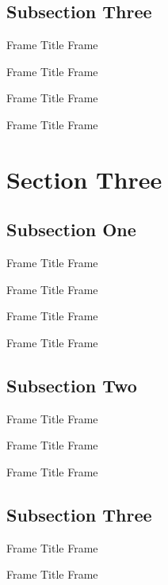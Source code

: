\documentclass[14pt,xcolor={rgb}]{beamer}
\begin{document}
\subsection{Subsection Three}

\begin{frame}{Frame Title}
Frame \insertframenumber
\end{frame}

\begin{frame}{Frame Title}
Frame \insertframenumber
\end{frame}

\begin{frame}{Frame Title}
Frame \insertframenumber
\end{frame}

\begin{frame}{Frame Title}
Frame \insertframenumber
\end{frame}

\section{Section Three}

\subsection{Subsection One}

\begin{frame}{Frame Title}
Frame \insertframenumber
\end{frame}

\begin{frame}{Frame Title}
Frame \insertframenumber
\end{frame}

\begin{frame}{Frame Title}
Frame \insertframenumber
\end{frame}

\begin{frame}{Frame Title}
Frame \insertframenumber
\end{frame}

\subsection{Subsection Two}

\begin{frame}{Frame Title}
Frame \insertframenumber
\end{frame}

\begin{frame}{Frame Title}
Frame \insertframenumber
\end{frame}

\begin{frame}{Frame Title}
Frame \insertframenumber
\end{frame}

\subsection{Subsection Three}

\begin{frame}{Frame Title}
Frame \insertframenumber
\end{frame}

\begin{frame}{Frame Title}
Frame \insertframenumber
\end{frame}
\end{document}
